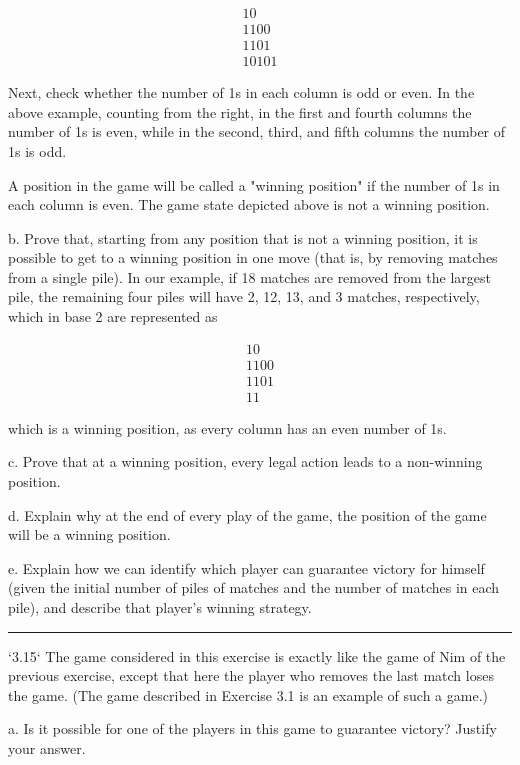 \documentclass[10pt]{report}
\begin{document}
$$\begin{array}{c}10\\ 1100\\ 1101\\ 10101\end{array}$$

Next, check whether the number of 1s in each column is odd or even. In the above example, counting from the right, in the first and fourth columns the number of 1s is even, while in the second, third, and fifth columns the number of 1s is odd.

A position in the game will be called a "winning position" if the number of 1s in each column is even. The game state depicted above is not a winning position.

b. Prove that, starting from any position that is not a winning position, it is possible to get to a winning position in one move (that is, by removing matches from a single pile). In our example, if 18 matches are removed from the largest pile, the remaining four piles will have 2, 12, 13, and 3 matches, respectively, which in base 2 are represented as

$$\begin{array}{c}10\\ 1100\\ 1101\\ 11\end{array}$$

which is a winning position, as every column has an even number of 1s.

c. Prove that at a winning position, every legal action leads to a non-winning position.

d. Explain why at the end of every play of the game, the position of the game will be a winning position.

e. Explain how we can identify which player can guarantee victory for himself (given the initial number of piles of matches and the number of matches in each pile), and describe that player's winning strategy.

\vspace{0.5cm}
\hrule
\vspace{0.5cm}
`3.15` The game considered in this exercise is exactly like the game of Nim of the previous exercise, except that here the player who removes the last match loses the game. (The game described in Exercise 3.1 is an example of such a game.)

a. Is it possible for one of the players in this game to guarantee victory? Justify your answer.
\end{document}
